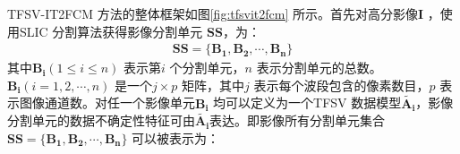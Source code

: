 TFSV-IT2FCM 方法的整体框架如图\ref{fig:tfsvit2fcm} 所示。首先对高分影像$\bm{I}$ ，使用SLIC 分割算法获得影像分割单元 $\bm{SS}$，为：
\begin{equation}\label{eq:image_ss}
    \begin{split}
        \bm{SS} = \lbrace \bm{B_1}, \bm{B_2},\bm{\cdots}, \bm{B_n} \rbrace
    \end{split}
\end{equation}
其中$\bm{B_i}(1 \leq i \leq n)$ 表示第$i$ 个分割单元，$n$ 表示分割单元的总数。 $\bm{B_i}(i=1,2,\cdots, n)$ 是一个$j \times p$ 矩阵，其中$j$ 表示每个波段包含的像素数目，$p$ 表示图像通道数。对任一个影像单元$\bm{B_i}$ 均可以定义为一个TFSV 数据模型$\bm{\tilde{A_i}}$，影像分割单元的数据不确定性特征可由$\bm{\tilde{A_i}}$表达。即影像所有分割单元集合$\bm{SS} = \lbrace \bm{B_1}, \bm{B_2},\bm{\cdots}, \bm{B_n} \rbrace$ 可以被表示为：

